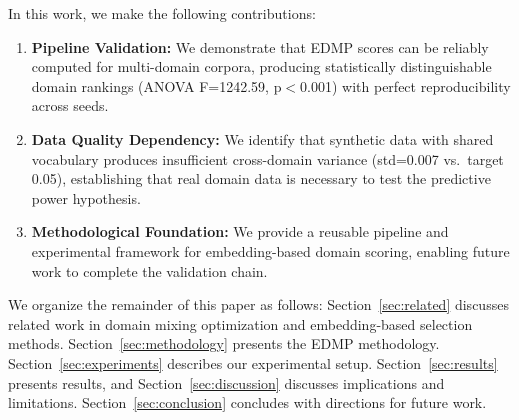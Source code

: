 In this work, we make the following contributions:

\begin{enumerate}
    \item \textbf{Pipeline Validation:} We demonstrate that EDMP scores can be reliably computed for multi-domain corpora, producing statistically distinguishable domain rankings (ANOVA F=1242.59, p$<$0.001) with perfect reproducibility across seeds.

    \item \textbf{Data Quality Dependency:} We identify that synthetic data with shared vocabulary produces insufficient cross-domain variance (std=0.007 vs.\ target 0.05), establishing that real domain data is necessary to test the predictive power hypothesis.

    \item \textbf{Methodological Foundation:} We provide a reusable pipeline and experimental framework for embedding-based domain scoring, enabling future work to complete the validation chain.
\end{enumerate}

We organize the remainder of this paper as follows: Section~\ref{sec:related} discusses related work in domain mixing optimization and embedding-based selection methods. Section~\ref{sec:methodology} presents the EDMP methodology. Section~\ref{sec:experiments} describes our experimental setup. Section~\ref{sec:results} presents results, and Section~\ref{sec:discussion} discusses implications and limitations. Section~\ref{sec:conclusion} concludes with directions for future work.
